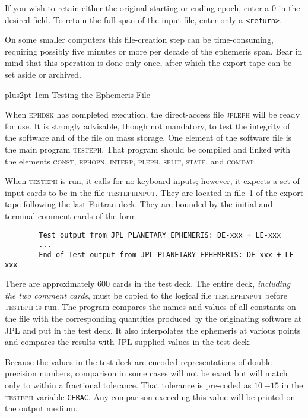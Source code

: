 \documentclass[twoside,11pt]{article}
\renewcommand{\_}{\texttt{\symbol{95}}}
\newcommand{\hdg}[1]{\vskip4pt plus2pt\leavevmode\kern-1em \underline{\large{#1}}\par}
\newcommand{\hdg}[1]{\subsection*{{#1}}}
\begin{document}
If you wish to retain either the original starting or ending epoch,
enter a 0 in the desired field. To retain the full span
of the input file, enter only a {\tt <return>}.

On some smaller computers this file-creation
step can be time-consuming, requiring possibly five minutes or
more per decade of the ephemeris span. Bear in mind that this
operation is done only once, after which the export tape
can be set aside or archived.

\hdg{Testing the Ephemeris File}

When \textsc{ephdsk} has completed execution, the direct-access file
\textsc{jpleph} will be ready for use. It is strongly advisable, though
not mandatory, to test the integrity of the software
and of the file on mass storage.
One element of the software file is the main program \textsc{testeph}.
That program should be compiled and linked with the elements
\textsc{const, ephopn, interp, pleph, split, state}, and \textsc{comdat}.

When \textsc{testeph} is run, it calls for no keyboard inputs; however,
it expects a set of input cards to be in the file \textsc{testephinput}.
They are located in file~1 of the export tape following the last
Fortran deck. They are bounded by the initial and terminal
comment cards of the form
\begin{verbatim}
        Test output from JPL PLANETARY EPHEMERIS: DE-xxx + LE-xxx
        ...
        End of Test output from JPL PLANETARY EPHEMERIS: DE-xxx + LE-xxx
\end{verbatim}

There are approximately 600 cards in the test deck. The entire deck, {\it
including the two comment cards}, must be copied to the  logical file
\textsc{testephinput} before \textsc{testeph} is run. The program compares
the names and values of all constants on the file with the
corresponding quantities produced by the originating software at
JPL and put in the test deck. It also interpolates the ephemeris
at various points and compares the results with JPL-supplied values
in the test deck.

Because the values in the test deck are encoded representations of
double-precision numbers, comparison in some cases will
not be exact but will match only to within a fractional tolerance.
That tolerance
is pre-coded as $10~{-15}$ in the \textsc{testeph} variable
{\tt CFRAC}. Any comparison exceeding this value will be
printed on the output medium.
\end{document}
